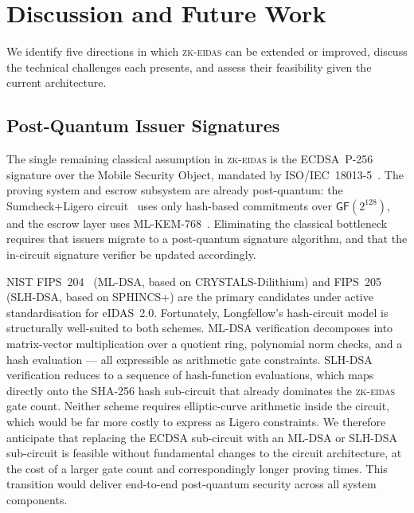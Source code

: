 \section{Discussion and Future Work}\label{sec:discussion}

We identify five directions in which \textsc{zk-eidas} can be extended or improved,
discuss the technical challenges each presents, and assess their feasibility given
the current architecture.

\subsection{Post-Quantum Issuer Signatures}\label{sec:disc-pq-issuer}

The single remaining classical assumption in \textsc{zk-eidas} is the ECDSA~P-256
signature over the Mobile Security Object, mandated by ISO/IEC~18013-5~\cite{iso18013}.
The proving system and escrow subsystem are already post-quantum: the Sumcheck+Ligero
circuit~\cite{longfellow} uses only hash-based commitments over $\mathsf{GF}(2^{128})$,
and the escrow layer uses ML-KEM-768~\cite{fips203}.
Eliminating the classical bottleneck requires that issuers migrate to a
post-quantum signature algorithm, and that the in-circuit signature verifier be
updated accordingly.

NIST FIPS~204~\cite{fips204} (ML-DSA, based on CRYSTALS-Dilithium) and
FIPS~205~\cite{fips205} (SLH-DSA, based on SPHINCS+) are the primary candidates
under active standardisation for eIDAS~2.0.
Fortunately, Longfellow's hash-circuit model is structurally well-suited to both
schemes.
ML-DSA verification decomposes into matrix-vector multiplication over a quotient ring,
polynomial norm checks, and a hash evaluation --- all expressible as arithmetic gate
constraints.
SLH-DSA verification reduces to a sequence of hash-function evaluations, which maps
directly onto the SHA-256 hash sub-circuit that already dominates the \textsc{zk-eidas}
gate count.
Neither scheme requires elliptic-curve arithmetic inside the circuit, which would be
far more costly to express as Ligero constraints.
We therefore anticipate that replacing the ECDSA sub-circuit with an ML-DSA or SLH-DSA
sub-circuit is feasible without fundamental changes to the circuit architecture, at the
cost of a larger gate count and correspondingly longer proving times.
This transition would deliver end-to-end post-quantum security across all system components.

